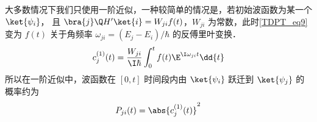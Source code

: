大多数情况下我们只使用一阶近似，一种较简单的情况是，若初始波函数为某一个 $\ket{\psi_i}$， 且 $\bra{j}\Q H'\ket{i} = W_{ji}f(t)$，$W_{ji}$ 为常数，此时\autoref{TDPT_eq9} 变为 $f(t)$ 关于角频率 $\omega_{ji} = (E_j-E_i)/\hbar$ 的反傅里叶变换．
\begin{equation}
c_j^{(1)}(t) = \frac{W_{ji}}{\I\hbar} \int_0^t f(t)\E^{\I\omega_{ji} t} \dd{t}
\end{equation}
所以在一阶近似中，波函数在 $[0,t]$ 时间段内由 $\ket{\psi_i}$ 跃迁到 $\ket{\psi_j}$ 的概率约为
\begin{equation}
P_{ji}(t) = \abs{c_j^{(1)}(t)}^2
\end{equation}

